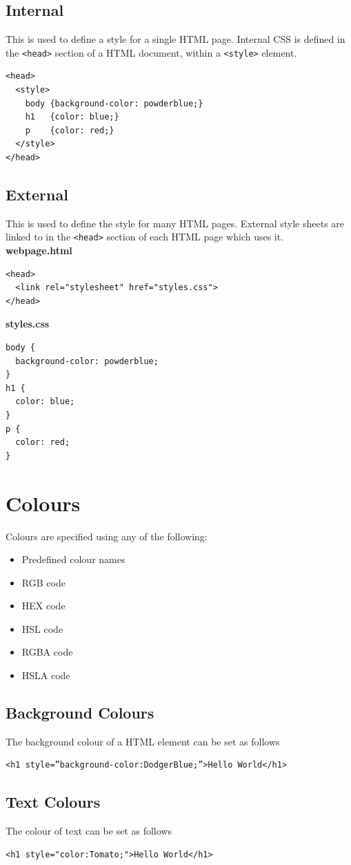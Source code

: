 \documentclass{thomasClass}
\begin{document}
\subsection{Internal}
This is used to define a style for a single HTML page. Internal CSS is defined in the \verb|<head>| section of a HTML document, within a \verb|<style>| element.
\begin{verbatim}
<head>
  <style>
    body {background-color: powderblue;}
    h1   {color: blue;}
    p    {color: red;}
  </style>
</head>
\end{verbatim}
\subsection{External}
This is used to define the style for many HTML pages. External style sheets are linked to in the \verb|<head>| section of each HTML page which uses it.\\
\textbf{webpage.html}
\begin{verbatim}
<head>
  <link rel="stylesheet" href="styles.css">
</head>
\end{verbatim}
\textbf{styles.css}
\begin{verbatim}
body {
  background-color: powderblue;
}
h1 {
  color: blue;
}
p {
  color: red;
}
\end{verbatim}

\section{Colours}
Colours are specified using any of the following:
\begin{itemize}
    \item Predefined colour names
    \item RGB code
    \item HEX code
    \item HSL code
    \item RGBA code
    \item HSLA code
\end{itemize}
\subsection{Background Colours}
The background colour of a HTML element can be set as follows
\begin{Verbatim}[breaklines=true, breakanywhere=true]
<h1 style=”background-color:DodgerBlue;”>Hello World</h1>
\end{Verbatim}
\subsection{Text Colours}
The colour of text can be set as follows
\begin{Verbatim}[breaklines=true, breakanywhere=true]
<h1 style="color:Tomato;">Hello World</h1>
\end{Verbatim}
\end{document}
